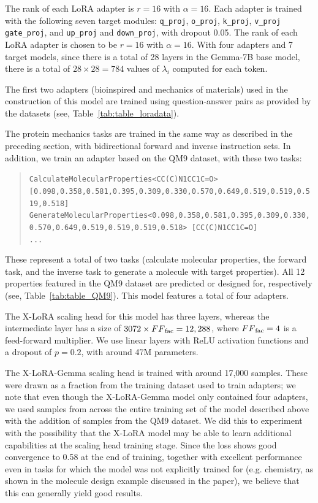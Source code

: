 The rank of each LoRA adapter is $r=16$ with $\alpha=16$. Each adapter is trained with the following seven target  modules: \texttt{q\_proj}, \texttt{o\_proj}, \texttt{k\_proj}, \texttt{v\_proj} \texttt{gate\_proj}, and \texttt{up\_proj} and \texttt{down\_proj}, with dropout 0.05. The rank of each LoRA adapter is  chosen to be $r=16$ with $\alpha=16$. With four adapters and 7 target models, since there is a total of 28 layers in the Gemma-7B base model, there is a total of $28\times 28=784$ values of $\lambda_i$ computed for each token.


The first two adapters (bioinspired and mechanics of materials) used in the construction of this model are trained using question-answer pairs as provided by the datasets (see, Table~\ref{tab:table_loradata}). 

The protein mechanics tasks are trained in the same way as described in the preceding section, with bidirectional forward and inverse instruction sets. In addition, we train an adapter based on the QM9 dataset, with these two tasks:  
\begin{quote}
\tiny {\texttt{CalculateMolecularProperties<CC(C)N1CC1C=O> [0.098,0.358,0.581,0.395,0.309,0.330,0.570,0.649,0.519,0.519,0.519,0.518]\\
GenerateMolecularProperties<0.098,0.358,0.581,0.395,0.309,0.330,0.570,0.649,0.519,0.519,0.519,0.518> [CC(C)N1CC1C=O]\\ 
...
}}
\end{quote}
These represent a total of two tasks (calculate molecular properties, the forward task, and the inverse task to generate a molecule with target properties). All 12 properties featured in the QM9 dataset are predicted or designed for, respectively (see, Table~\ref{tab:table_QM9}). 
This model features a total of four adapters. 

The X-LoRA scaling head for this model has three layers, whereas the intermediate layer has a size of $3072\times {FF}_{\rm fac}=12,288$, where ${FF}_{\rm fac}=4$ is a feed-forward multiplier. We use linear layers with ReLU activation functions and a dropout of $p=0.2$, with around 47M parameters.

The X-LoRA-Gemma scaling head is trained with around 17,000 samples. These were drawn as a fraction from the training dataset used to train adapters; we note that even though the X-LoRA-Gemma model only contained four adapters, we used samples from across the entire training set of the model described above with the addition of samples from the QM9 dataset. We did this to experiment with the possibility that the X-LoRA model may be able to learn additional capabilities at the scaling head training stage. Since the loss shows good convergence to 0.58 at the end of training, together with excellent performance even in tasks for which the model was not explicitly trained for (e.g. chemistry, as shown in the molecule design example discussed in the paper), we believe that this can generally yield good results.

